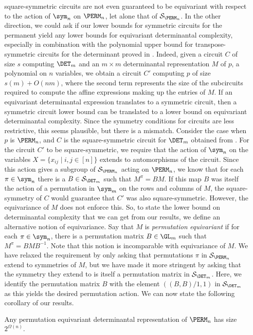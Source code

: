 \documentclass{toc}
\begin{document}
square-symmetric %
circuits are not even guaranteed to be equivariant with respect to the action of $\sym_n$ on $\PERM_n$, let alone that of $\mathcal{S}_{\PERM_n}$.
In the other direction, we could ask if our lower bounds for symmetric circuits for the permanent yield any lower bounds for equivariant determinantal complexity, especially in combination with the polynomial upper bound for transpose-symmetric circuits for the determinant proved in .  Indeed, given a circuit $C$ of size $s$ computing $\DET_m$ and an $m\times m$ determinantal representation $M$ of $p$, a polynomial on $n$ variables, we obtain a circuit $C'$ computing $p$ of size $s(m)+ O(nm)$, where the second term represents the size of the subcircuits required to compute the affine expressions making up the entries of $M$.  If an equivariant determinantal expression translates to a symmetric circuit, then a symmetric circuit lower bound can be translated to a lower bound on equivariant determinantal complexity.  Since the symmetry conditions for circuits are less restrictive, this seems plausible, but there is a mismatch.
Consider the case when $p$ is $\PERM_n$, and $C$ is the
square-symmetric %
circuit for $\DET_m$ obtained from .  For the circuit $C'$ to be square-symmetric, we require that the action of $\sym_n$ on the variables $X =\{x_{ij} \mid i,j \in [n]\}$ extends to automorphisms of the circuit.  Since this action gives a subgroup of $\mathcal{S}_{\PERM_n}$ acting on $\PERM_n$, we know that for each $\pi \in \sym_n$ there is a $B \in \mathcal{S}_{\DET_m}$ such that $M^{\pi} = BM$.  If this map $B$ was itself the action of a permutation in $\sym_m$ on the rows and columns of $M$, the square-symmetry of $C$ would guarantee that $C'$ was also square-symmetric.  %
However, the equivariance of $M$ does not enforce this.  So, to state the lower bound on determinantal complexity that we can get from our results, we define an alternative notion of equivariance.
Say that $M$ is \emph{permutation equivariant} if for each $\pi \in
\sym_n$, there is a permutation matrix $B \in \GL_m$ such that
$M^{\pi} = BMB^{-1}$.  Note that this notion is incomparable with
equivariance of $M$.  We have relaxed the requirement by only asking
that permutations $\pi$ in $\mathcal{S}_{\PERM_n}$ extend to
symmetries of $M$, but we have made it more stringent by asking that
the symmetry they extend to is itself a permutation matrix in
$\mathcal{S}_{\DET_m}$.  Here, we identify the permutation matrix $B$
with the element $((B,B)/1,1)$ in $\mathcal{S}_{\DET_m}$ as this yields
the desired permutation action.
We can now state the following corollary of our results.
\begin{corollary}
Any permutation equivariant determinantal representation of $\PERM_n$ has size $2^{\Omega(n)}$.
\end{corollary}
\end{document}

